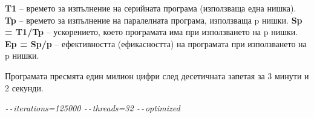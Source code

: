 \documentclass[a4paper,english]{article}
\begin{document}
    
\textbf{T1} – времето за изпълнение на серийната програма (използваща една нишка). \newline
\textbf{Tp} – времето за изпълнение на паралелната програма, използваща p нишки. \newline
\textbf{Sp = T1/Tp} – ускорението, което програмата има при използването на p нишки. \newline
\textbf{Ep = Sp/p} – ефективността (ефикасността) на програмата при използването на p нишки. \newline

Програмата пресмята един милион цифри след десетичната запетая за 3 минути и 2 секунди.
	\begin{center}
		\textit{\texttt{-{}-}iterations=125000 \texttt{-{}-}threads=32 \texttt{-{}-}optimized}
	\end{center}
\end{document}
